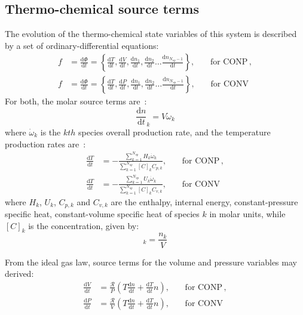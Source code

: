 \documentclass[12pt]{article}
\newcommand{\ns}{\ensuremath{{N_{sp}}}}
\newcommand{\conp}{CONP}
\newcommand{\conv}{CONV}
\newcommand{\dconp}{\ensuremath{,\qquad\text{for \conp}}}
\newcommand{\dconv}{\ensuremath{,\qquad\text{for \conv}}}
\newcommand{\Ru}{\ensuremath{\mathcal{R}}}
\begin{document}
\subsection{Thermo-chemical source terms}
The evolution of the thermo-chemical state variables of this system is described by a set of ordinary-differential equations:
\begin{subequations}
\label{e:source_terms}
\begin{align}
f &= \frac{\text{d} \Phi }{\text{d} t } = \left\{\frac{\text{d} T }{\text{d} t },\frac{\text{d} V }{\text{d} t },\frac{\text{d} n_1}{\text{d} t },\frac{\text{d} n_2 }{\text{d} t }\ldots \frac{\text{d} n_{\ns - 1} }{\text{d} t }\right\}\dconp, \\
f &= \frac{\text{d} \Phi }{\text{d} t } = \left\{\frac{\text{d} T }{\text{d} t },\frac{\text{d} P }{\text{d} t },\frac{\text{d} n_1}{\text{d} t },\frac{\text{d} n_2 }{\text{d} t }\ldots \frac{\text{d} n_{\ns - 1} }{\text{d} t }\right\}\dconv 
\end{align}
\end{subequations}
For both, the molar source terms are~\cite{TurnsStephenR2012Aitc}:
\begin{equation}
\frac{\text{d} n }{\text{d} t }_{k} = V \dot{\omega}_{k} \label{e:spec}
\end{equation}
where $\dot{\omega}_k$ is the $kth$ species overall production rate, and the temperature production rates are~\cite{TurnsStephenR2012Aitc}:
\begin{subequations}
\label{e:temperature_incomplete}
\begin{align}
\frac{\text{d} T }{\text{d} t } &= - \frac{\sum_{k=1}^{\ns} H_{k} \dot{\omega}_{k}}{\sum_{k=1}^{\ns} [C]_{k} {C_{p, k}}}\dconp, \\
\frac{\text{d} T }{\text{d} t } &= - \frac{\sum_{k=1}^{\ns} U_{k} \dot{\omega}_{k}}{\sum_{k=1}^{\ns} [C]_{k} {C_{v, k}}}\dconv
\end{align}
\end{subequations}
where $H_k$, $U_k$, $C_{p,k}$ and $C_{v, k}$ are the enthalpy, internal energy, constant-pressure specific heat, constant-volume specific heat of species $k$ in molar units, while $[C]_{k}$ is the concentration, given by:
\begin{equation}
 [C]_{k} = \frac{n_{k}}{V}
\end{equation}


From the ideal gas law, source terms for the volume and pressure variables may derived:
\begin{subequations}
\label{e:param_incomplete}
\begin{align}
\frac{\text{d} V }{\text{d} t } &= \frac{\Ru}{P} \left(T \frac{\text{d} n }{\text{d} t } + \frac{\text{d} T }{\text{d} t } n\right)\dconp, \\
\frac{\text{d} P }{\text{d} t } &= \frac{\Ru}{V} \left(T \frac{\text{d} n }{\text{d} t } + \frac{\text{d} T }{\text{d} t } n\right)\dconv
\end{align}
\end{subequations}
\end{document}
